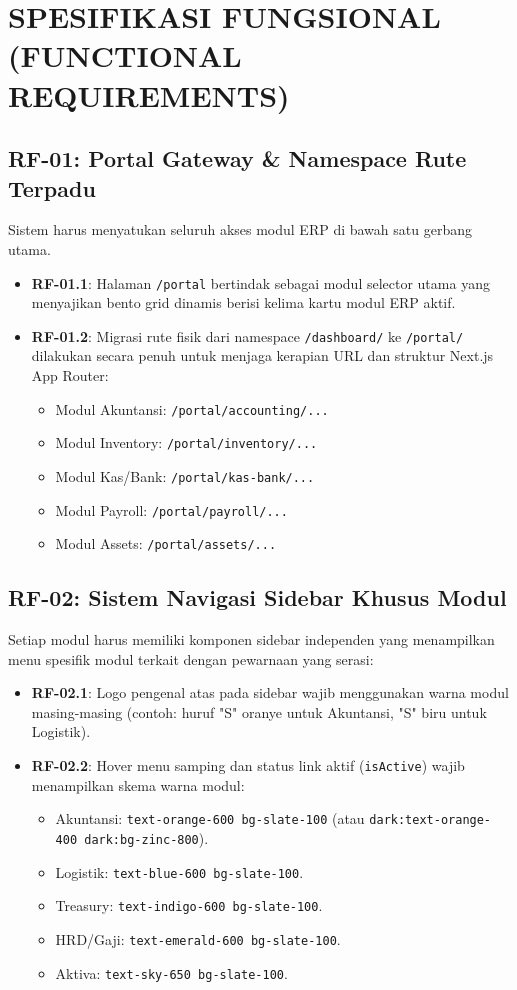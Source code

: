 \documentclass[11pt,a4paper]{article}
\begin{document}
\section{SPESIFIKASI FUNGSIONAL (FUNCTIONAL REQUIREMENTS)}

\subsection{RF-01: Portal Gateway \& Namespace Rute Terpadu}
Sistem harus menyatukan seluruh akses modul ERP di bawah satu gerbang utama.
\begin{itemize}
    \item \textbf{RF-01.1}: Halaman \texttt{/portal} bertindak sebagai modul selector utama yang menyajikan bento grid dinamis berisi kelima kartu modul ERP aktif.
    \item \textbf{RF-01.2}: Migrasi rute fisik dari namespace \texttt{/dashboard/} ke \texttt{/portal/} dilakukan secara penuh untuk menjaga kerapian URL dan struktur Next.js App Router:
    \begin{itemize}
        \item Modul Akuntansi: \texttt{/portal/accounting/...}
        \item Modul Inventory: \texttt{/portal/inventory/...}
        \item Modul Kas/Bank: \texttt{/portal/kas-bank/...}
        \item Modul Payroll: \texttt{/portal/payroll/...}
        \item Modul Assets: \texttt{/portal/assets/...}
    \end{itemize}
\end{itemize}

\subsection{RF-02: Sistem Navigasi Sidebar Khusus Modul}
Setiap modul harus memiliki komponen sidebar independen yang menampilkan menu spesifik modul terkait dengan pewarnaan yang serasi:
\begin{itemize}
    \item \textbf{RF-02.1}: Logo pengenal atas pada sidebar wajib menggunakan warna modul masing-masing (contoh: huruf "S" oranye untuk Akuntansi, "S" biru untuk Logistik).
    \item \textbf{RF-02.2}: Hover menu samping dan status link aktif (\texttt{isActive}) wajib menampilkan skema warna modul:
    \begin{itemize}
        \item Akuntansi: \texttt{text-orange-600 bg-slate-100} (atau \texttt{dark:text-orange-400 dark:bg-zinc-800}).
        \item Logistik: \texttt{text-blue-600 bg-slate-100}.
        \item Treasury: \texttt{text-indigo-600 bg-slate-100}.
        \item HRD/Gaji: \texttt{text-emerald-600 bg-slate-100}.
        \item Aktiva: \texttt{text-sky-650 bg-slate-100}.
    \end{itemize}
\end{itemize}
\end{document}
